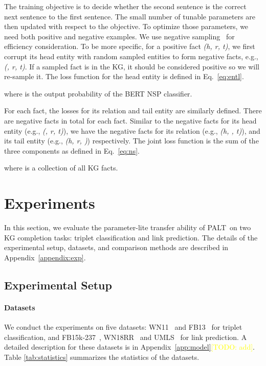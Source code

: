 \documentclass[11pt]{article}
\newcommand{\method}{\textsc{PALT}}
\newcommand{\texthrt}[1]{\textsl{#1}}
\newcommand{\todo}[1]{\textcolor{yellow}{[TODO: #1]}}
\newcommand{\todo}[1]{}
\begin{document}
The training objective is to decide whether the second sentence is the correct next sentence to the first sentence. The small number of tunable parameters are then updated with respect to the objective. To optimize those parameters, we need both positive and negative examples. We use negative sampling~\cite{negativesample} for efficiency consideration. To be more specific, for a positive fact \texthrt{(h, r, t)}, we first corrupt its head entity with  random sampled entities to form negative facts, e.g., \texthrt{(, r, t)}. If a sampled fact is in the KG, it should be considered positive so we will re-sample it. The loss function for the head entity is defined in Eq.~\ref{eq:entl}.

where  is the output probability of the BERT NSP classifier.

For each fact, the losses for its relation  and tail entity  are similarly defined. There are  negative facts in total for each fact. Similar to the negative facts for its head entity (e.g., \texthrt{(, r, t)}), we have the negative facts for its relation (e.g., \texthrt{(h, , t)}), and its tail entity (e.g., \texthrt{(h, r, )}) respectively. The joint loss function is the sum of the three components as defined in Eq.~\ref{eq:ns}.

where  is a collection of all KG facts.







 \section{Experiments}
In this section, we evaluate the parameter-lite transfer ability of \method\ on two KG completion tasks: triplet classification and link prediction. The details of the experimental setup, datasets, and comparison methods are described in Appendix~\ref{appendix:exp}.
\subsection{Experimental Setup}
\label{sec:expset}
\paragraph{Datasets} 
We conduct the experiments on five datasets: WN11~\cite{KB_NL_1} and FB13~\cite{KB_NL_1} for triplet classification, and FB15k-237~\cite{toutanova_observed_2015}, WN18RR~\cite{ConvE} and UMLS~\cite{ConvE} for link prediction. A detailed description for these datasets is in Appendix~\ref{app:model}\todo{add}. Table \ref{tab:statistics} summarizes the statistics of the datasets.
\end{document}
